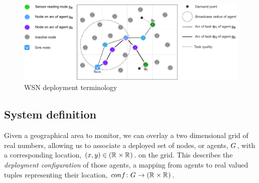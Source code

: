 
\begin{figure}
\centering 
\includegraphics[width=0.9\linewidth]{grid_concept}
\caption[WSN deployment terminology]{WSN deployment terminology}
\label{fig:gridconcept}
\end{figure}

\subsection{System definition}
Given a geographical area to monitor, we can overlay a two dimensional grid of real numbers, allowing us to associate a deployed set of nodes, or agents, $G_{}^{}$, with a corresponding location, $(x,y) \in (\mathbb{R}_{}^{} \times \mathbb{R}_{}^{})$. on the grid. This describes the \textit{deployment configuration} of those agents, a mapping from agents to real valued tuples representing their location,  $\formalDeployment{}{}$.

